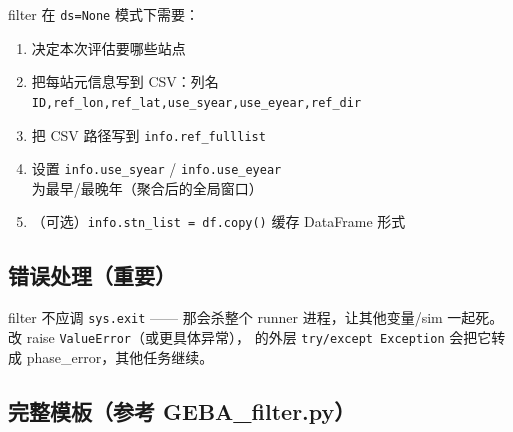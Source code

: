 filter 在 \texttt{ds=None} 模式下需要：

\begin{enumerate}
  \item 决定本次评估要哪些站点
  \item 把每站元信息写到 CSV：列名 \texttt{ID,ref\_lon,ref\_lat,use\_syear,use\_eyear,ref\_dir}
  \item 把 CSV 路径写到 \texttt{info.ref\_fulllist}
  \item 设置 \texttt{info.use\_syear} / \texttt{info.use\_eyear} 为最早/最晚年（聚合后的全局窗口）
  \item （可选）\texttt{info.stn\_list = df.copy()} 缓存 DataFrame 形式
\end{enumerate}

\subsection{错误处理（重要）}

filter 不应调 \texttt{sys.exit} —— 那会杀整个 runner 进程，让其他变量/sim 一起死。改 raise \texttt{ValueError}（或更具体异常）， 的外层 \texttt{try/except Exception} 会把它转成 phase\_error，其他任务继续。

\subsection{完整模板（参考 GEBA\_filter.py）}

